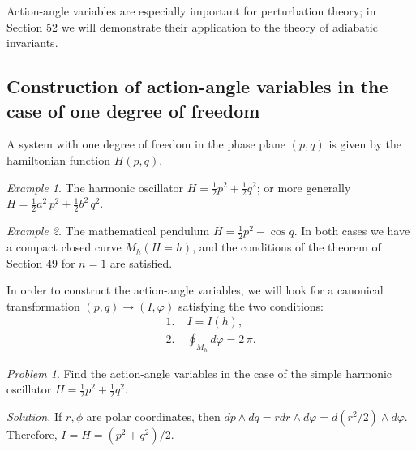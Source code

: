 \documentclass[leqno]{report}
\numberwithin{equation}{section}
\theoremstyle{plain}
\theoremstyle{definition}
\theoremstyle{remark}
\theoremstyle{smallcap}
\newtheorem{ex}{Example}
\newtheorem*{prob*}{Problem}
\numberwithin{prob}{section}
\newcommand{\solution}[1]{\textit{Solution.} #1}
\begin{document}
Action-angle variables are especially important for perturbation theory;
in Section 52 we will demonstrate their application to the theory
of adiabatic invariants.


\subsection{Construction of action-angle variables in the
  case of one degree of freedom}

A system with one degree of freedom in the phase plane $(p,q)$
is given by the hamiltonian function $H(p, q)$.

\begin{ex}
  The harmonic oscillator $H = \frac{1}{2} p^2 + \frac{1}{2} q^2$;
  or more generally $H = \frac{1}{2} a^2 \, p^2 + \frac{1}{2} b^2 \, q^2$.

\end{ex}

\begin{ex}
  The mathematical pendulum $H = \frac{1}{2} p^2 - \cos q$.
  In both cases we have a compact closed curve
  $M_h(H = h)$, and the conditions of the theorem of Section 49
  for $n = 1$ are satisfied.
\end{ex}

In order to construct the action-angle variables,
we will look for a canonical transformation
$(p, q) \to (I, \varphi)$
satisfying the two conditions:
\begin{equation}
  \begin{aligned}
    1. \; & I = I(h), \\
    2. \; & \oint_{M_h} d\varphi = 2 \, \pi.
  \end{aligned}
  \label{eq:CT_Iphi_condition}
\end{equation}

\begin{prob*}
  Find the action-angle variables in the case of the simple harmonic oscillator
  $H = \frac{1}{2} p^2 + \frac{1}{2} q^2$.

  \solution{
    If $r, \phi$ are polar coordinates,
    then $dp \wedge dq = r dr \wedge d\varphi = d(r^2/2) \wedge d\varphi$.
    Therefore, $I = H = (p^2 + q^2)/2$.
  }
\end{prob*}
\end{document}
